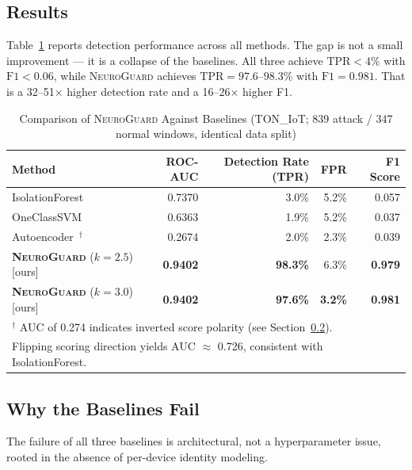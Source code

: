 \documentclass[journal,10pt,twoside]{IEEEtran}
\newcommand{\neuroguard}{\textsc{NeuroGuard}}
\begin{document}
\subsection{Results}

Table~\ref{tab:baselines} reports detection performance across all methods.
The gap is not a small improvement --- it is a collapse of the baselines.
All three achieve $\text{TPR} < 4\%$ with $\text{F1} < 0.06$, while
\neuroguard{} achieves $\text{TPR} = 97.6$--$98.3\%$ with $\text{F1} = 0.981$.
That is a 32--51$\times$ higher detection rate and a 16--26$\times$ higher F1.

\begin{table}[!t]
  \caption{Comparison of \neuroguard{} Against Baselines
           (TON\_IoT; 839 attack / 347 normal windows, identical data split)}
  \label{tab:baselines}
  \centering
  \begin{tabular}{lrrrr}
    \toprule
    Method & ROC-AUC & Detection Rate (TPR) & FPR & F1 Score \\
    \midrule
    IsolationForest~\cite{liu2008iforest}        & 0.7370 & 3.0\%  & 5.2\% & 0.057 \\
    OneClassSVM~\cite{scholkopf1999ocsvm}        & 0.6363 & 1.9\%  & 5.2\% & 0.037 \\
    Autoencoder~\cite{gong2019memorize}$^\dagger$& 0.2674 & 2.0\%  & 2.3\% & 0.039 \\
    \midrule
    \textbf{\neuroguard{}} ($k=2.5$) [ours]
      & \textbf{0.9402} & \textbf{98.3\%} & 6.3\% & \textbf{0.979} \\
    \textbf{\neuroguard{}} ($k=3.0$) [ours]
      & \textbf{0.9402} & \textbf{97.6\%} & \textbf{3.2\%} & \textbf{0.981} \\
    \bottomrule
    \multicolumn{5}{l}{$^\dagger$ AUC of 0.274 indicates inverted score polarity
      (see Section~\ref{sec:baseline-analysis}).} \\
    \multicolumn{5}{l}{\phantom{$^\dagger$} Flipping scoring direction yields
      AUC $\approx$ 0.726, consistent with IsolationForest.} \\
  \end{tabular}
\end{table}

\subsection{Why the Baselines Fail}
\label{sec:baseline-analysis}

The failure of all three baselines is architectural, not a
hyperparameter issue, rooted in the absence of per-device identity modeling.
\end{document}
